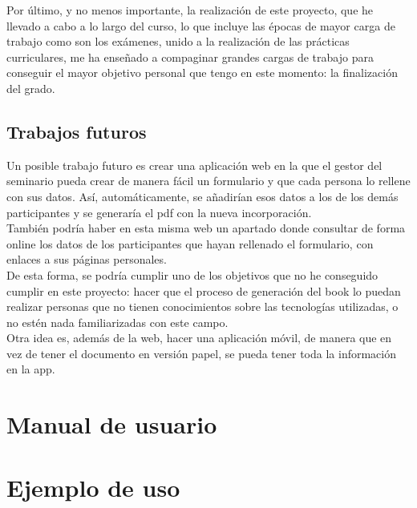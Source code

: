 \documentclass[a4paper, 12pt]{book}
\begin{document}
Por último, y no menos importante, la realización de este proyecto, que he llevado a cabo a lo largo del curso, lo que incluye las épocas de mayor carga de trabajo como son los exámenes, unido a la realización de las prácticas curriculares, me ha enseñado a compaginar grandes cargas de trabajo para conseguir el mayor objetivo personal que tengo en este momento: la finalización del grado.


\section{Trabajos futuros}
\label{sec:trabajos_futuros}
Un posible trabajo futuro es crear una aplicación web en la que el gestor del seminario pueda crear de manera fácil un formulario y que cada persona lo rellene con sus datos. Así, automáticamente, se añadirían esos datos a los de los demás participantes y se generaría el pdf con la nueva incorporación.\\

También podría haber en esta misma web un apartado donde consultar de forma online los datos de los participantes que hayan rellenado el formulario, con enlaces a sus páginas personales.\\

De esta forma, se podría cumplir uno de los objetivos que no he conseguido cumplir en este proyecto: hacer que el proceso de generación del book lo puedan realizar personas que no tienen conocimientos sobre las tecnologías utilizadas, o no estén nada familiarizadas con este campo.\\

Otra idea es, además de la web, hacer una aplicación móvil, de manera que en vez de tener el documento en versión papel, se pueda tener toda la información en la app.







\cleardoublepage
\appendix
\chapter{Manual de usuario}
\label{app:manual}


\chapter{Ejemplo de uso}
\label{app:ejemplos}
%
\end{document}
